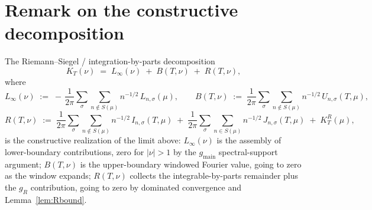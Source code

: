 \documentclass[11pt]{article}
\begin{document}
\section*{Remark on the constructive decomposition}

The Riemann--Siegel / integration-by-parts decomposition
\[
K_{T}(\nu) \;=\; L_{\infty}(\nu) \;+\; B(T,\nu) \;+\; R(T,\nu),
\]
where
\[
L_{\infty}(\nu) \;:=\; -\,\frac{1}{2\pi}\sum_{\sigma}\sum_{n\notin S(\mu)} n^{-1/2}\,L_{n,\sigma}(\mu),
\qquad
B(T,\nu) \;:=\; \frac{1}{2\pi}\sum_{\sigma}\sum_{n\notin S(\mu)} n^{-1/2}\,U_{n,\sigma}(T,\mu),
\]
\[
R(T,\nu) \;:=\; \frac{1}{2\pi}\sum_{\sigma}\sum_{n\notin S(\mu)} n^{-1/2}\,I_{n,\sigma}(T,\mu) \;+\; \frac{1}{2\pi}\sum_{\sigma}\sum_{n\in S(\mu)} n^{-1/2}\,J_{n,\sigma}(T,\mu) \;+\; K_{T}^{R}(\mu),
\]
is the constructive realization of the limit above: $L_{\infty}(\nu)$ is the assembly of lower-boundary contributions, zero for $|\nu|>1$ by the $g_{\mathrm{main}}$ spectral-support argument; $B(T,\nu)$ is the upper-boundary windowed Fourier value, going to zero as the window expands; $R(T,\nu)$ collects the integrable-by-parts remainder plus the $g_{R}$ contribution, going to zero by dominated convergence and Lemma~\ref{lem:Rbound}.
\end{document}
